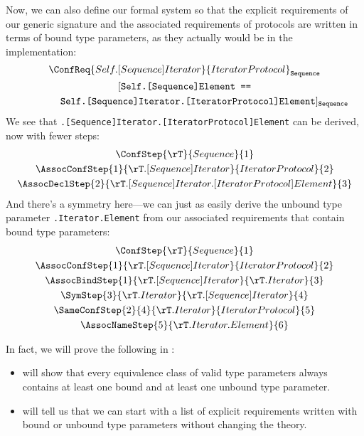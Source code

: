 \documentclass[../generics]{subfiles}
\begin{document}
\begin{example}
Now, we can also define our formal system so that the explicit requirements of our generic signature and the associated requirements of protocols are written in terms of bound type parameters, as they actually would be in the implementation:
\begin{gather*}
\ConfReq{Self.[Sequence]Iterator}{IteratorProtocol}_\texttt{Sequence}\\
[\texttt{Self.[Sequence]Element ==}\\
\qquad\qquad\texttt{Self.[Sequence]Iterator.[IteratorProtocol]Element}]_\texttt{Sequence}
\end{gather*}
We see that \texttt{\rT.[Sequence]Iterator.[IteratorProtocol]Element} can be derived, now with fewer steps:
\begin{gather*}
\ConfStep{\rT}{Sequence}{1}\\
\AssocConfStep{1}{\rT.[Sequence]Iterator}{IteratorProtocol}{2}\\
\AssocDeclStep{2}{\rT.[Sequence]Iterator.[IteratorProtocol]Element}{3}
\end{gather*}
And there's a symmetry here---we can just as easily derive the unbound type parameter \texttt{\rT.Iterator.Element} from our associated requirements that contain bound type parameters:
\begin{gather*}
\ConfStep{\rT}{Sequence}{1}\\
\AssocConfStep{1}{\rT.[Sequence]Iterator}{IteratorProtocol}{2}\\
\AssocBindStep{1}{\rT.[Sequence]Iterator}{\rT.Iterator}{3}\\
\SymStep{3}{\rT.Iterator}{\rT.[Sequence]Iterator}{4}\\
\SameConfStep{2}{4}{\rT.Iterator}{IteratorProtocol}{5}\\
\AssocNameStep{5}{\rT.Iterator.Element}{6}
\end{gather*}
\end{example}

In fact, we will prove the following in :
\begin{itemize}
\item {} will show that every equivalence class of valid type parameters always contains at least one bound and at least one unbound type parameter.
\item {} will tell us that we can start with a list of explicit requirements written with bound or unbound type parameters without changing the theory.
\end{itemize}
\end{document}
